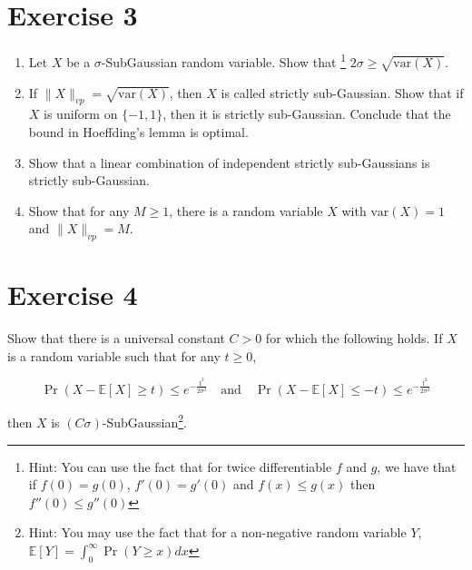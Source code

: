 \documentclass[a4 paper]{article}
\numberwithin{equation}{section}
\theoremstyle{boldStyle}
\theoremstyle{boldBlueStyle}
\theoremstyle{boldPurpleStyle}
\theoremstyle{boldRedStyle}
\begin{document}
\section*{Exercise 3}
\begin{enumerate}
\item Let \(X\) be a \(\sigma\)-SubGaussian random variable. Show that
\footnote{Hint: You can use the fact that for twice differentiable \( f \) and \( g \), we have that if \( f(0) = g(0) \), \( f'(0) = g'(0) \) and \( f(x) \leq g(x) \) then \( f''(0) \leq g''(0) \)}
\(2\sigma \geq \sqrt{\mathrm{var}(X)}\).



\newpage
\item If \(\|X\|_{vp} = \sqrt{\mathrm{var}(X)}\), then \(X\) is called strictly sub-Gaussian. 
Show that if \(X\) is uniform on \(\{-1, 1\}\), then it is strictly sub-Gaussian. Conclude that the bound in Hoeffding's lemma is optimal.



\newpage
\item Show that a linear combination of independent strictly sub-Gaussians is strictly sub-Gaussian.



\newpage
\item Show that for any \(M \geq 1\), there is a random variable \(X\) with \(\mathrm{var}(X) = 1\) and \(\|X\|_{vp} = M\).
\end{enumerate}

\newpage
\section*{Exercise 4}
Show that there is a universal constant \(C > 0\) for which the following holds. If \(X\) is a random variable such that for any \(t \geq 0\),

\[
\Pr(X - \mathbb{E}[X] \geq t) \leq e^{-\frac{t^2}{2\sigma^2}} \quad \text{and} \quad \Pr(X - \mathbb{E}[X] \leq -t) \leq e^{-\frac{t^2}{2\sigma^2}}
\]

then \(X\) is \((C\sigma)\)-SubGaussian\footnote{Hint: You may use the fact that for a non-negative random variable \(Y\), \(\mathbb{E}[Y] = \int_0^\infty \Pr(Y \geq x)dx\)}.
\end{document}
